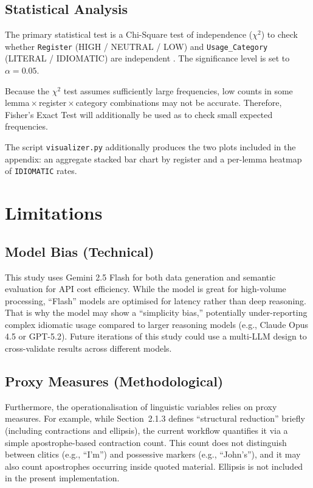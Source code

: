\subsection{Statistical Analysis}
The primary statistical test is a Chi-Square test of independence ($\chi^2$) to check whether \texttt{Register} (HIGH / NEUTRAL / LOW) and \texttt{Usage\_Category} (LITERAL / IDIOMATIC) are independent \parencite{agrestiCategoricalData2012}. The significance level is set to $\alpha = 0.05$.

Because the $\chi^2$ test assumes sufficiently large frequencies, low counts in some lemma\,$\times$\,register\,$\times$\,category combinations may not be accurate. Therefore, Fisher's Exact Test \parencite*{Fisher1992exacttest} will additionally be used as to check small expected frequencies.

The script \texttt{visualizer.py} additionally produces the two plots included in the appendix: an aggregate stacked bar chart by register and a per-lemma heatmap of \texttt{IDIOMATIC} rates.

\section{Limitations}

\subsection{Model Bias (Technical)}
This study uses Gemini 2.5 Flash for both data generation and semantic evaluation for API cost efficiency. While the model is great for high-volume processing, ``Flash'' models are optimised for latency rather than deep reasoning. That is why the model may show a ``simplicity bias,'' potentially under-reporting complex idiomatic usage compared to larger reasoning models (e.g., Claude Opus 4.5 or GPT-5.2). Future iterations of this study could use a multi-LLM design to cross-validate results across different models.

\subsection{Proxy Measures (Methodological)}
Furthermore, the operationalisation of linguistic variables relies on proxy measures. For example, while Section~2.1.3 defines ``structural reduction'' briefly (including contractions and ellipsis), the current workflow quantifies it via a simple apostrophe-based contraction count. This count does not distinguish between clitics (e.g., ``I'm'') and possessive markers (e.g., ``John's''), and it may also count apostrophes occurring inside quoted material. Ellipsis is not included in the present implementation.

